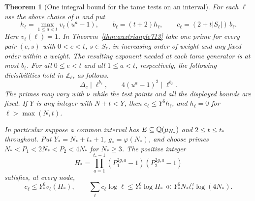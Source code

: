 \documentclass[a4paper,11pt]{article}
\newtheorem{theorem}[proposition]{Theorem}
\theoremstyle{definition}
\theoremstyle{remark}
\newcommand{\ZZ}{\mathbb Z}\newcommand{\ord}{\operatorname{ord}}
\numberwithin{equation}{section}
\begin{document}
\begin{theorem}[One integral bound for the tame tests on an interval]
\leavevmode\label{thm:trianglebudget714}
For each \(\ell\) use the above choice of \(u\) and put
\[
 h_\ell=\max_{1\le a<t}v_\ell(u^a-1),\qquad
 b_\ell=(t+2)h_\ell,\qquad
 c_\ell=(2+t|S_\ell|)\,b_\ell .
\]
Here \(v_\ell(\ell)=1\). In Theorem~\ref{thm:auxtriangle713}
take one prime for every pair \((e,s)\) with \(0<e<t\),
\(s\in S_\ell\), in increasing order of weight and any fixed
order within a weight. The resulting exponent needed at
each tame generator is at most \(b_\ell\). For all \(0\le e<t\)
and all \(1\le a<t\), respectively, the following divisibilities
hold in \(\ZZ_\ell\), as follows.
\[
          \Delta_e\mid\ell^{b_\ell},\qquad
          4(u^a-1)^2\mid\ell^{b_\ell}.
\]
The primes may vary with \(\nu\) while the test points and all
the displayed bounds are fixed. If \(Y\) is any integer with
\(N+t<Y\), then \(c_\ell\le Y^6 h_\ell\), and \(h_\ell=0\)
for \(\ell>\max(N,t)\).

In particular suppose a common interval has
\(E\subseteq\mathbb Q(\mu_{N_*})\) and \(2\le t\le t_*\) throughout.
Put \(Y_*=N_*+t_*+1\), \(g_*=\varphi(N_*)\), and choose
primes \(N_*<P_1<2N_*<P_2<4N_*\) for \(N_*\ge3\).
The positive integer
\[
       H_*=\prod_{a=1}^{t_*-1}
              (P_1^{2g_*a}-1)(P_2^{2g_*a}-1)
\]
satisfies, at every node,
\[
  c_\ell\le Y_*^6 v_\ell(H_*),\qquad
  \sum_{\ell} c_\ell\log\ell
       \le Y_*^6\log H_*
       \ll Y_*^6 N_*t_*^2\log(4N_*).
\]
\end{theorem}
\end{document}
